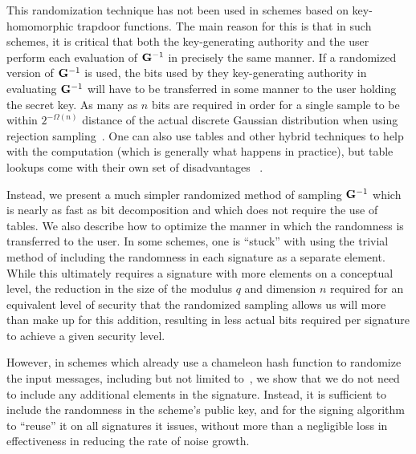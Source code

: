 This randomization technique has not been used in schemes based on
key-homomorphic trapdoor functions.  The main reason for this is that
in such schemes, it is critical that both the key-generating authority
and the user perform each evaluation of $\mathbf{G}^{-1}$ in precisely the
same manner. If a randomized version of $\mathbf{G}^{-1}$ is used, the bits
used by they key-generating authority in evaluating $\mathbf{G}^{-1}$ will
have to be transferred in some manner to the user holding the secret
key. As many as $n$ bits are required in order for a single sample to
be within $2^{-\Omega(n)}$ distance of the actual discrete Gaussian
distribution when using rejection
sampling~\cite{DBLP:conf/stoc/GentryPV08}. One can also use tables and
other hybrid techniques to help with the computation (which is generally what happens in practice), but table lookups come with their own set of
disadvantages ~\cite{DBLP:journals/aaecc/DwarakanathG14}.

Instead, we present a much simpler randomized method of sampling
$\mathbf{G}^{-1}$ which is nearly as fast as bit decomposition and which
does not require the use of tables. We also describe how to optimize the manner in
which the randomness is transferred to the user. In some schemes, one
is ``stuck'' with using the trivial method of including the randomness
in each signature as a separate element. While this ultimately
requires a signature with more elements on a conceptual level, the
reduction in the size of the modulus $q$ and dimension $n$ required
for an equivalent level of security that the randomized sampling
allows us will more than make up for this addition, resulting in less
actual bits required per signature to achieve a given security level.

However, in schemes which already use a chameleon hash function to
randomize the input messages, including but not limited
to~\cite{DBLP:conf/pkc/Alperin-Sheriff15,DBLP:conf/eurocrypt/MicciancioP12,DBLP:conf/pkc/Boyen10,DBLP:conf/crypto/DucasM14}, we show that we do not need to include any additional elements in the
signature. Instead, it is sufficient to include the randomness in the
scheme's public key, and for the signing algorithm to ``reuse'' it on
all signatures it issues, without more than a negligible loss in
effectiveness in reducing the rate of noise growth.

